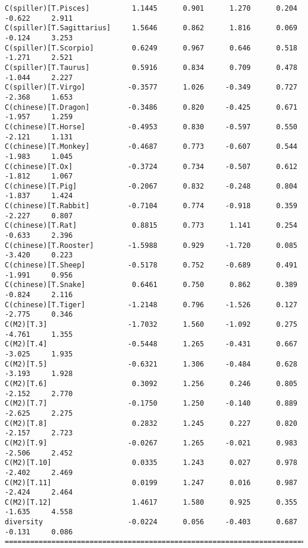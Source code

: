 \documentclass[12pt,fleqn]{article}\usepackage{../common}
\begin{document}
\begin{verbatim}
C(spiller)[T.Pisces]          1.1445      0.901      1.270      0.204        -0.622     2.911
C(spiller)[T.Sagittarius]     1.5646      0.862      1.816      0.069        -0.124     3.253
C(spiller)[T.Scorpio]         0.6249      0.967      0.646      0.518        -1.271     2.521
C(spiller)[T.Taurus]          0.5916      0.834      0.709      0.478        -1.044     2.227
C(spiller)[T.Virgo]          -0.3577      1.026     -0.349      0.727        -2.368     1.653
C(chinese)[T.Dragon]         -0.3486      0.820     -0.425      0.671        -1.957     1.259
C(chinese)[T.Horse]          -0.4953      0.830     -0.597      0.550        -2.121     1.131
C(chinese)[T.Monkey]         -0.4687      0.773     -0.607      0.544        -1.983     1.045
C(chinese)[T.Ox]             -0.3724      0.734     -0.507      0.612        -1.812     1.067
C(chinese)[T.Pig]            -0.2067      0.832     -0.248      0.804        -1.837     1.424
C(chinese)[T.Rabbit]         -0.7104      0.774     -0.918      0.359        -2.227     0.807
C(chinese)[T.Rat]             0.8815      0.773      1.141      0.254        -0.633     2.396
C(chinese)[T.Rooster]        -1.5988      0.929     -1.720      0.085        -3.420     0.223
C(chinese)[T.Sheep]          -0.5178      0.752     -0.689      0.491        -1.991     0.956
C(chinese)[T.Snake]           0.6461      0.750      0.862      0.389        -0.824     2.116
C(chinese)[T.Tiger]          -1.2148      0.796     -1.526      0.127        -2.775     0.346
C(M2)[T.3]                   -1.7032      1.560     -1.092      0.275        -4.761     1.355
C(M2)[T.4]                   -0.5448      1.265     -0.431      0.667        -3.025     1.935
C(M2)[T.5]                   -0.6321      1.306     -0.484      0.628        -3.193     1.928
C(M2)[T.6]                    0.3092      1.256      0.246      0.805        -2.152     2.770
C(M2)[T.7]                   -0.1750      1.250     -0.140      0.889        -2.625     2.275
C(M2)[T.8]                    0.2832      1.245      0.227      0.820        -2.157     2.723
C(M2)[T.9]                   -0.0267      1.265     -0.021      0.983        -2.506     2.452
C(M2)[T.10]                   0.0335      1.243      0.027      0.978        -2.402     2.469
C(M2)[T.11]                   0.0199      1.247      0.016      0.987        -2.424     2.464
C(M2)[T.12]                   1.4617      1.580      0.925      0.355        -1.635     4.558
diversity                    -0.0224      0.056     -0.403      0.687        -0.131     0.086
=============================================================================================
\end{verbatim}
\end{document}
